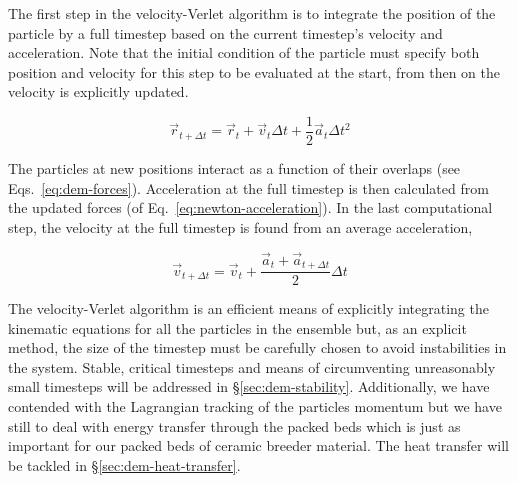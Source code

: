 The first step in the velocity-Verlet algorithm is to integrate the position of the particle by a full timestep based on the current timestep's velocity and acceleration. Note that the initial condition of the particle must specify both position and velocity for this step to be evaluated at the start, from then on the velocity is explicitly updated.

\begin{equation}
	\vec{r}_{t+\Delta t} = \vec{r}_t + \vec{v}_t\Delta t + \frac{1}{2}\vec{a}_t\Delta t^2
\end{equation}

The particles at new positions interact as a function of their overlaps (see Eqs.~\ref{eq:dem-forces}). Acceleration at the full timestep is then calculated from the updated forces (of Eq.~\ref{eq:newton-acceleration}). In the last computational step, the velocity at the full timestep is found from an average acceleration,

\begin{equation}
	\vec{v}_{t+\Delta t} = \vec{v}_t + \frac{\vec{a}_t + \vec{a}_{t+\Delta t}}{2}\Delta t
\end{equation}

The velocity-Verlet algorithm is an efficient means of explicitly integrating the kinematic equations for all the particles in the ensemble but, as an explicit method, the size of the timestep must be carefully chosen to avoid instabilities in the system. Stable, critical timesteps and means of circumventing unreasonably small timesteps will be addressed in \S\ref{sec:dem-stability}. Additionally, we have contended with the Lagrangian tracking of the particles momentum but we have still to deal with energy transfer through the packed beds which is just as important for our packed beds of ceramic breeder material. The heat transfer will be tackled in \S\ref{sec:dem-heat-transfer}.